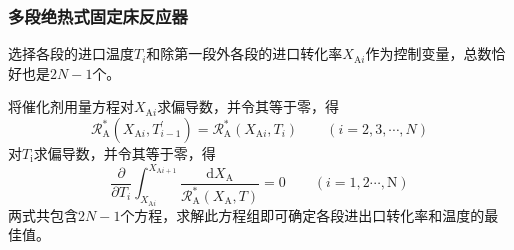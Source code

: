 \begin{frame}
    \frametitle{多段绝热式固定床反应器}

    选择各段的进口温度$T_{i}$和除第一段外各段的进口转化率$X_{\mathrm{A} i}$作为控制变量，总数恰好也是$2N-1$个。
    
    将催化剂用量方程对$X_{\mathrm{A}i}$求偏导数，并令其等于零，得
    \[
        \mathscr{R}_{\mathrm{A}}^{*}(X_{\mathrm{A} i}, T_{i-1}^{\prime})=\mathscr{R}_{\mathrm{A}}^{*}(X_{\mathrm{A} i}, T_{i}) \qquad(i=2,3, \cdots, N)
    \]
    对$T_{\mathrm{i}}$求偏导数，并令其等于零，得
    \[
        \frac{\partial}{\partial T_{i}} \int_{X_{\mathrm{A} i}}^{X_{\mathrm{A} i+1}} \frac{\mathrm{d} X_{\mathrm{A}}}{\mathscr{R}_{\mathrm{A}}^{*}(X_{\mathrm{A}}, T)}=0 \qquad(i=1,2 \cdots, \mathrm{N})
    \]
    两式共包含$2N-1$个方程，求解此方程组即可确定各段进出口转化率和温度的最佳值。

\end{frame}
